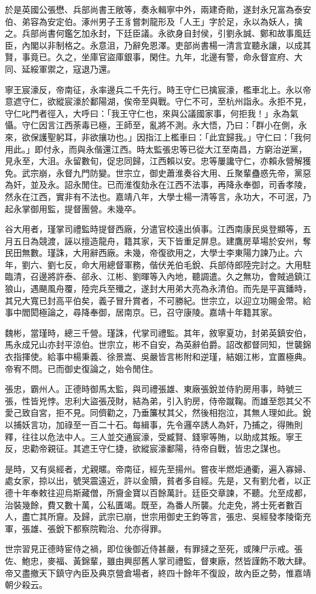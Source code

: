 \begin{pinyinscope}
於是英國公張懋、兵部尚書王敞等，奏永輯寧中外，兩建奇勛，遂封永兄富為泰安伯、弟容為安定伯。涿州男子王豸嘗刺龍形及「人王」字於足，永以為妖人，擒之。兵部尚書何鑑乞加永封，下廷臣議。永欲身自封侯，引劉永誠、鄭和故事風廷臣，內閣以非制格之。永意沮，乃辭免恩澤。吏部尚書楊一清言宜聽永讓，以成其賢，事竟已。久之，坐庫官盜庫銀事，閑住。九年，北邊有警，命永督宣府、大同、延綏軍禦之，寇退乃還。

寧王宸濠反，帝南征，永率邊兵二千先行。時王守仁已擒宸濠，檻車北上。永以帝意遮守仁，欲縱宸濠於鄱陽湖，俟帝至與戰。守仁不可，至杭州詣永。永拒不見，守仁叱門者徑入，大呼曰：「我王守仁也，來與公議國家事，何拒我！」永為氣懾。守仁因言江西荼毒已極，王師至，亂將不測。永大悟，乃曰：「群小在側，永來，欲保護聖躬耳，非欲攘功也。」因指江上檻車曰：「此宜歸我。」守仁曰：「我何用此。」即付永，而與永偕還江西。時太監張忠等已從大江至南昌，方窮治逆黨，見永至，大沮。永留數旬，促忠同歸，江西賴以安。忠等屢讒守仁，亦賴永營解獲免。武宗崩，永督九門防變。世宗立，御史蕭淮奏谷大用、丘聚輩蠱惑先帝，黨惡為奸，並及永。詔永閒住。已而淮復劾永在江西不法事，再降永奉御，司香孝陵，然永在江西，實非有不法也。嘉靖八年，大學士楊一清等言，永功大，不可泯，乃起永掌御用監，提督團營。未幾卒。

谷大用者，瑾掌司禮監時提督西廠，分遣官校遠出偵事。江西南康民吳登顯等，五月五日為競渡，誣以擅造龍舟，籍其家，天下皆重足屏息。建鷹房草場於安州，奪民田無數。瑾誅，大用辭西廠。未幾，帝復欲用之，大學士李東陽力諫乃止。六年，劉六、劉七反，命大用總督軍務，偕伏羌伯毛銳、兵部侍郎陸完討之。大用駐臨清，召邊將許泰、郤永、江彬、劉暉等入內地，聽調遣。久之無功，會賊過鎮江狼山，遇颶風舟覆，陸完兵至殲之，遂封大用弟大亮為永清伯。而先是平寘鐇時，其兄大寬已封高平伯矣，義子冒升賞者，不可勝紀。世宗立，以迎立功賜金幣。給事中閻閎極論之，尋降奉御，居南京。已，召守康陵。嘉靖十年籍其家。

魏彬，當瑾時，總三千營。瑾誅，代掌司禮監。其年，敘寧夏功，封弟英鎮安伯，馬永成兄山亦封平涼伯。世宗立，彬不自安，為英辭伯爵。詔改都督同知，世襲錦衣指揮使。給事中楊秉義、徐景嵩、吳嚴皆言彬附和逆瑾，結姻江彬，宜置極典。帝宥不問。已而御史復論之，始令閒住。

張忠，霸州人。正德時御馬太監，與司禮張雄、東廠張銳並侍豹房用事，時號三張，性皆兇悖。忠利大盜張茂財，結為弟，引入豹房，侍帝蹴鞠。而雄至怨其父不愛己致自宮，拒不見。同儕勸之，乃垂簾杖其父，然後相抱泣，其無人理如此。銳以捕妖言功，加祿至一百二十石。每緝事，先令邏卒誘人為奸，乃捕之，得賄則釋，往往以危法中人。三人並交通宸濠，受臧賢、錢寧等賄，以助成其叛。寧王反，忠勸帝親征。其遮王守仁捷，欲縱宸濠鄱陽，待帝自戰，皆忠之謀也。

是時，又有吳經者，尤親暱。帝南征，經先至揚州。嘗夜半燃炬通衢，遍入寡婦、處女家，掠以出，號哭震遠近，許以金贖，貧者多自經。先是，又有劉允者，以正德十年奉敕往迎烏斯藏僧，所齎金寶以百餘萬計。廷臣交章諫，不聽。允至成都，治裝幾餘，費又數十萬，公私匱竭。既至，為番人所襲。允走免，將士死者數百人，盡亡其所齎。及歸，武宗已崩，世宗用御史王鈞等言，張忠、吳經發孝陵衛充軍，張雄、張銳下都察院鞫治、允亦得罪。

世宗習見正德時宦侍之禍，即位後御近侍甚嚴，有罪撻之至死，或陳尸示戒。張佐、鮑忠，麥福、黃錦輩，雖由興邸舊人掌司禮監，督東廠，然皆謹飭不敢大肆。帝又盡撤天下鎮守內臣及典京營倉場者，終四十餘年不復設，故內臣之勢，惟嘉靖朝少殺云。


\end{pinyinscope}